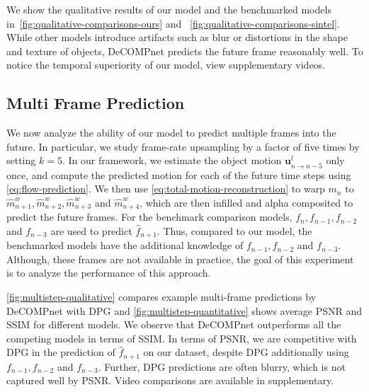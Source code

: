 \documentclass[preprint]{vgtc}
\begin{document}
    We show the qualitative results of our model and the benchmarked models in~\autoref{fig:qualitative-comparisons-ours} and ~\autoref{fig:qualitative-comparisons-sintel}.
    While other models introduce artifacts such as blur or distortions in the shape and texture of objects, DeCOMPnet predicts the future frame reasonably well.
To notice the temporal superiority of our model, view supplementary videos.



    \subsection{Multi Frame Prediction}\label{subsec:multi-frame-prediction}
    We now analyze the ability of our model to predict multiple frames into the future.
    In particular, we study frame-rate upsampling by a factor of five times by setting $k=5$.
In our framework, we estimate the object motion $\mathbf{u}^l_{n \rightarrow {n-5}}$ only once, and compute the predicted motion for each of the future time steps using \autoref{eq:flow-prediction}.
    We then use \autoref{eq:total-motion-reconstruction} to warp $m_n$ to $\hat{m}^w_{n+1}, \hat{m}^w_{n+2}, \hat{m}^w_{n+3}$ and $\hat{m}^w_{n+4}$, which are then infilled and alpha composited to predict the future frames.
    For the benchmark comparison models, $f_{n}, f_{n-1}, f_{n-2}$ and $f_{n-3}$ are used to predict $\hat{f}_{n+1}$.
Thus, compared to our model, the benchmarked models have the additional knowledge of $f_{n-1}, f_{n-2}$ and $f_{n-3}$.
    Although, these frames are not available in practice, the goal of this experiment is to analyze the performance of this approach.


    \autoref{fig:multistep-qualitative} compares example multi-frame predictions by DeCOMPnet with DPG and \autoref{fig:multistep-quantitative} shows average PSNR and SSIM for different models.
    We observe that DeCOMPnet outperforms all the competing models in terms of SSIM.
    In terms of PSNR, we are competitive with DPG in the prediction of $\hat{f}_{n+1}$ on our dataset, despite DPG additionally using $f_{n-1}, f_{n-2}$ and $f_{n-3}$.
    Further, DPG predictions are often blurry, which is not captured well by PSNR.
Video comparisons are available in supplementary.
\end{document}
